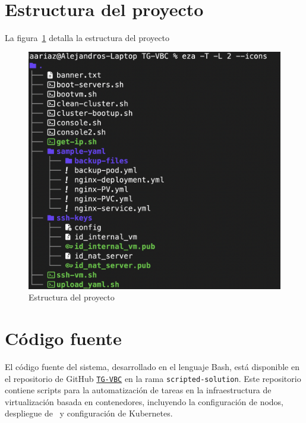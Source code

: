 \label{cap:pmv}
\mbox{}\\
\section{Estructura del proyecto}
\noindent
La figura~\ref{fig:estructura-proyecto} detalla la estructura del proyecto
\begin{figure}[H]
    \centering
    \includegraphics[scale=0.2]{tablas-images/cp6/src/tree.png}
    \caption{Estructura del proyecto}\label{fig:estructura-proyecto}
\end{figure}

\section{Código fuente}
El código fuente del sistema, desarrollado en el lenguaje Bash, está disponible en el repositorio de GitHub \href{https://github.com/AariazP/TG-VBC.git}{\texttt{TG-VBC}} en la rama \texttt{scripted-solution}. Este repositorio contiene scripts para la automatización de tareas en la infraestructura de virtualización basada en contenedores, incluyendo la configuración de nodos, despliegue de \VM\ y configuración de Kubernetes. 

